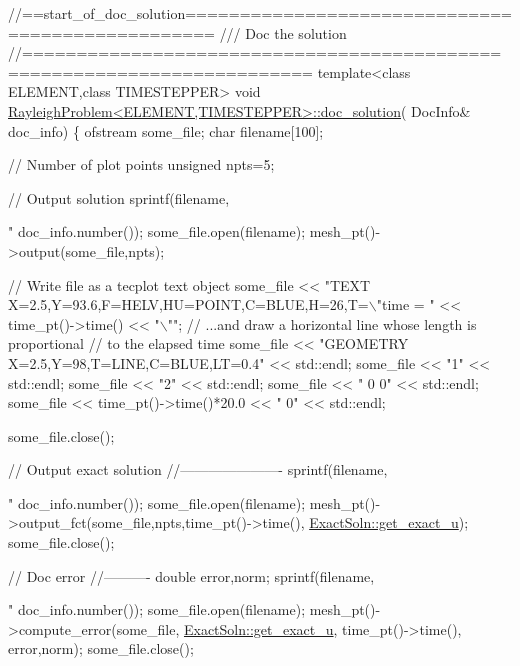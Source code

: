 \begin{DoxyCodeInclude}
\textcolor{comment}{//==start\_of\_doc\_solution=================================================}
\textcolor{comment}{/// Doc the solution}
\textcolor{comment}{}\textcolor{comment}{//========================================================================}
\textcolor{keyword}{template}<\textcolor{keyword}{class} ELEMENT,\textcolor{keyword}{class} TIMESTEPPER>
\textcolor{keywordtype}{void} \hyperlink{classRayleighProblem_aca1b0f4134bc745c75ae524450e97109}{RayleighProblem<ELEMENT,TIMESTEPPER>::doc\_solution}(
      DocInfo& doc\_info)
\{ 
 ofstream some\_file;
 \textcolor{keywordtype}{char} filename[100];

 \textcolor{comment}{// Number of plot points}
 \textcolor{keywordtype}{unsigned} npts=5; 

 \textcolor{comment}{// Output solution }
 sprintf(filename,\textcolor{stringliteral}{"%
         doc\_info.number());
 some\_file.open(filename);
 mesh\_pt()->output(some\_file,npts);

 \textcolor{comment}{// Write file as a tecplot text object}
 some\_file << \textcolor{stringliteral}{"TEXT X=2.5,Y=93.6,F=HELV,HU=POINT,C=BLUE,H=26,T=\(\backslash\)"time = "} 
           << time\_pt()->time() << \textcolor{stringliteral}{"\(\backslash\)""};
 \textcolor{comment}{// ...and draw a horizontal line whose length is proportional}
 \textcolor{comment}{// to the elapsed time}
 some\_file << \textcolor{stringliteral}{"GEOMETRY X=2.5,Y=98,T=LINE,C=BLUE,LT=0.4"} << std::endl;
 some\_file << \textcolor{stringliteral}{"1"} << std::endl;
 some\_file << \textcolor{stringliteral}{"2"} << std::endl;
 some\_file << \textcolor{stringliteral}{" 0 0"} << std::endl;
 some\_file << time\_pt()->time()*20.0 << \textcolor{stringliteral}{" 0"} << std::endl;

 some\_file.close();
 
 \textcolor{comment}{// Output exact solution }
 \textcolor{comment}{//----------------------}
 sprintf(filename,\textcolor{stringliteral}{"%
         doc\_info.number());
 some\_file.open(filename);
 mesh\_pt()->output\_fct(some\_file,npts,time\_pt()->time(),
                       \hyperlink{namespaceExactSoln_a2598550281dd62f4160edb3d0b2e5432}{ExactSoln::get\_exact\_u}); 
 some\_file.close();

 \textcolor{comment}{// Doc error}
 \textcolor{comment}{//----------}
 \textcolor{keywordtype}{double} error,norm;
 sprintf(filename,\textcolor{stringliteral}{"%
         doc\_info.number());
 some\_file.open(filename);
 mesh\_pt()->compute\_error(some\_file,
                          \hyperlink{namespaceExactSoln_a2598550281dd62f4160edb3d0b2e5432}{ExactSoln::get\_exact\_u},
                          time\_pt()->time(),
                          error,norm); 
 some\_file.close();

}}}
\end{DoxyCodeInclude}
